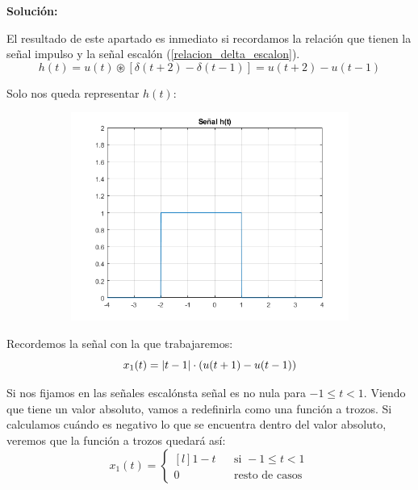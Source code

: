 \documentclass[a4paper]{book}
\begin{document}
\vspace{\parskip}
\textbf{Solución:}
\begin{myenumerate}
\item El resultado de este apartado es inmediato si recordamos la relación que tienen la señal impulso y la señal escalón (\ref{relacion_delta_escalon}).
\[h(t) = u(t) \circledast \left[ \delta (t+2) - \delta (t-1) \right] = \boxed{u(t+2) - u(t-1)}\]

Solo nos queda representar $h(t)$:
\begin{figure}[!ht]
\caption{}
\label{fig:Problema_1_a}
\centering
\begin{subfigure}[b]{0.7\linewidth}
\includegraphics[width=\linewidth]{./Imágenes/aar.png}
\end{subfigure}
\end{figure}
\item Recordemos la señal con la que trabajaremos: \[x_1(t) = \abs{t-1}\cdot \left( u(t+1) - u(t-1) \right)\]

Si nos fijamos en las señales escalónsta señal es no nula para $-1\leq t<1$. Viendo que tiene un valor absoluto, vamos a redefinirla como una función a trozos. Si calculamos cuándo es negativo lo que se encuentra dentro del valor absoluto, veremos que la función a trozos quedará así:
\[x_1(t) = \left\{ \begin{matrix*}[l]
1-t	&& \text{si } -1\leq t<1\\[5pt]
0	&& \text{resto de casos }
\end{matrix*} \right.\]


\end{myenumerate}
\end{document}
